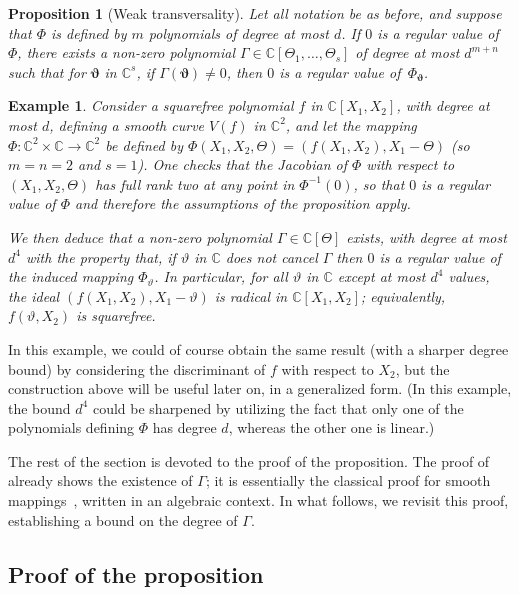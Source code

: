 \documentclass[12pt]{article}
\def\thetab{\bm{\vartheta}}
\def\dt{s}
\def\C{\mathbb{C}}
\newtheorem{ex}[theorem]{Example}
\newtheorem{prop}[theorem]{Proposition}
\begin{document}
\begin{prop} [Weak transversality]\label{prop:weak_t}
  Let all notation be as before, and suppose that $\Phi$ is defined by
  $m$ polynomials of degree at most $d$. If $0$ is a regular value of
  $\Phi$, there exists a non-zero polynomial $\Gamma \in
  \C[\Theta_1,\dots,\Theta_s]$ of degree at most $d^{m+n}$ such that
  for $\thetab$ in $\C^\dt$, if $\Gamma(\thetab)\ne 0$, then $0$ is a
  regular value of~$\Phi_{\thetab}$.
\end{prop}
\begin{ex}
  Consider a squarefree polynomial $f$ in $\C[X_1,X_2]$, with degree
  at most $d$, defining a smooth curve $V(f)$ in $\C^2$, and let the
  mapping $\Phi:\C^2\times \C \to \C^2$ be defined by
  $\Phi(X_1,X_2,\Theta) = (f(X_1,X_2), X_1-\Theta)$ (so $m=n=2$ and
  $s=1$). One checks that the Jacobian of $\Phi$ with respect to
  $(X_1,X_2,\Theta)$ has full rank two at any point in $\Phi^{-1}(0)$,
  so that $0$ is a regular value of $ \Phi$ and therefore the
  assumptions of the proposition apply.

  We then deduce that a non-zero polynomial $\Gamma \in \C[\Theta]$
  exists, with degree at most $d^{4}$ with the property that, if
  $\vartheta$ in $\C$ does not cancel $\Gamma$ then $0$ is a regular
  value of the induced mapping $ \Phi_{\vartheta}$. In particular, for
  all $\vartheta$ in $\C$ except at most $d^4$ values, the ideal
  $(f(X_1,X_2), X_1-\vartheta)$ is radical in $\C[X_1,X_2]$;
  equivalently, $f(\vartheta, X_2)$ is squarefree.
\end{ex}
In this example, we could of course obtain the same result (with a
sharper degree bound) by considering the discriminant of $f$ with
respect to $X_2$, but the construction above will be useful later on,
in a generalized form. (In this example, the bound $d^4$ could be
sharpened by utilizing the fact that only one of the polynomials
defining $\Phi$ has degree $d$, whereas the other one is linear.)

The rest of the section is devoted to the proof of the proposition.
The proof of \cite[Theorem B.3]{TWT} already shows the existence of
$\Gamma$; it is essentially the classical proof for smooth
mappings~\cite[Section~3.7]{demazure2000bifurcations}, written in an
algebraic context. In what follows, we revisit this proof,
establishing a bound on the degree of $\Gamma$.


\subsection{Proof of the proposition}
\end{document}
